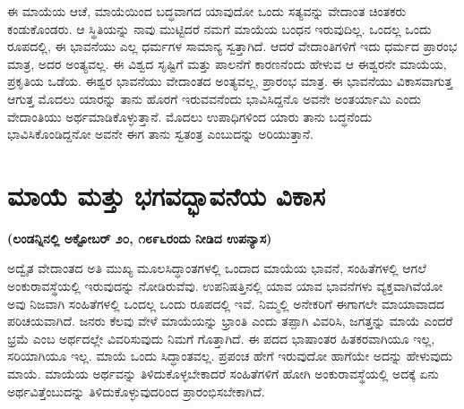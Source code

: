 \vskip 0.5cm

ಈ ಮಾಯೆಯ ಆಚೆ, ಮಾಯೆಯಿಂದ ಬದ್ಧವಾಗದ ಯಾವುದೋ ಒಂದು ಸತ್ಯವನ್ನು ವೇದಾಂತ ಚಿಂತಕರು ಕಂಡುಕೊಂಡರು. ಆ ಸ್ಥಿತಿಯನ್ನು ನಾವು ಮುಟ್ಟಿದರೆ ನಮಗೆ ಮಾಯೆಯ ಬಂಧನ ಇರುವುದಿಲ್ಲ. ಒಂದಲ್ಲ ಒಂದು ರೂಪದಲ್ಲಿ, ಈ ಭಾವನೆಯು ಎಲ್ಲ ಧರ್ಮಗಳ ಸಾಮಾನ್ಯ ಸ್ವತ್ತಾಗಿದೆ. ಆದರೆ ವೇದಾಂತಿಗಳಿಗೆ ಇದು ಧರ್ಮದ ಪ್ರಾರಂಭ ಮಾತ್ರ, ಅದರ ಅಂತ್ಯವಲ್ಲ. ಈ ವಿಶ್ವದ ಸೃಷ್ಟಿಗೆ ಮತ್ತು ಪಾಲನೆಗೆ ಕಾರಣನೆಂದು ಹೇಳುವ ಆ ಈಶ್ವರನೇ ಮಾಯೆಯ, ಪ್ರಕೃತಿಯ ಒಡೆಯ. ಈಶ್ವರ ಭಾವನೆಯು ವೇದಾಂತದ ಅಂತ್ಯವಲ್ಲ, ಪ್ರಾರಂಭ ಮಾತ್ರ. ಈ ಭಾವನೆಯು ವಿಕಾಸವಾಗುತ್ತ ಆಗುತ್ತ ಮೊದಲು ಯಾರನ್ನು ತಾನು ಹೊರಗೆ ಇರುವವನೆಂದು ಭಾವಿಸಿದ್ದನೊ ಅವನೇ ಅಂತರ್ಯಾಮಿ ಎಂದು ವೇದಾಂತಿಯು ಅರ್ಥಮಾಡಿಕೊಳ್ಳುತ್ತಾನೆ. ಮೊದಲು ಉಪಾಧಿಗಳಿಂದ ಯಾರು ತಾನು ಬದ್ಧನೆಂದು ಭಾವಿಸಿಕೊಂಡಿದ್ದನೋ ಅವನೇ ಈಗ ತಾನು ಸ್ವತಂತ್ರ ಎಂಬುದನ್ನು ಅರಿಯುತ್ತಾನೆ.

\chapter{ಮಾಯೆ ಮತ್ತು ಭಗವದ್ಭಾವನೆಯ ವಿಕಾಸ}%

\centerline{\textbf{(ಲಂಡನ್ನಿನಲ್ಲಿ ಅಕ್ಟೋಬರ್​ ೨೦, ೧೮೯೬ರಂದು ನೀಡಿದ ಉಪನ್ಯಾಸ)}}

\vskip 4pt

ಅದ್ವೈತ ವೇದಾಂತದ ಅತಿ ಮುಖ್ಯ ಮೂಲಸಿದ್ಧಾಂತಗಳಲ್ಲಿ ಒಂದಾದ ಮಾಯೆಯ ಭಾವನೆ, ಸಂಹಿತೆಗಳಲ್ಲಿ ಆಗಲೆ ಅಂಕುರಾವಸ್ಥೆಯಲ್ಲಿ ಇರುವುದನ್ನು ನೋಡಿರುವೆವು. ಉಪನಿಷತ್ತಿನಲ್ಲಿ ಯಾವ ಯಾವ ಭಾವನೆಗಳು ವ್ಯಕ್ತವಾಗಿವೆಯೋ ಅವು ನಿಜವಾಗಿ ಸಂಹಿತೆಗಳಲ್ಲಿ ಒಂದಲ್ಲ ಒಂದು ರೂಪದಲ್ಲಿ ಇವೆ. ನಿಮ್ಮಲ್ಲಿ ಅನೇಕರಿಗೆ ಈಗಾಗಲೇ ಮಾಯಾವಾದದ ಪರಿಚಯವಾಗಿದೆ. ಜನರು ಕೆಲವು ವೇಳೆ ಮಾಯೆಯನ್ನು ಭ್ರಾಂತಿ ಎಂದು ತಪ್ಪಾಗಿ ವಿವರಿಸಿ, ಜಗತ್ತನ್ನು ಮಾಯೆ ಎಂದರೆ ಭ್ರಮೆ ಎಂಬ ಅರ್ಥದಲ್ಲೇ ವಿವರಿಸುವುದು ನಿಮಗೆ ಗೊತ್ತಾಗಿದೆ. ಈ ಪದದ ಭಾಷಾಂತರ ಹಿತಕರವಾಗಿಯೂ ಇಲ್ಲ, ಸರಿಯಾಗಿಯೂ ಇಲ್ಲ. ಮಾಯೆ ಒಂದು ಸಿದ್ಧಾಂತವಲ್ಲ. ಪ್ರಪಂಚ ಹೇಗೆ ಇರುವುದೋ ಹಾಗೆಯೇ ಅದನ್ನು ಹೇಳುವುದು ಮಾಯೆ. ಮಾಯೆಯ ಅರ್ಥವನ್ನು ತಿಳಿದುಕೊಳ್ಳಬೇಕಾದರೆ ಸಂಹಿತೆಗಳಿಗೆ ಹೋಗಿ ಅಂಕುರಾವಸ್ಥೆಯಲ್ಲಿ ಅದಕ್ಕೆ ಏನು ಅರ್ಥವಿತ್ತೆಂಬುದನ್ನು ತಿಳಿದುಕೊಳ್ಳುವುದರಿಂದ ಪ್ರಾರಂಭಿಸಬೇಕಾಗಿದೆ.

\vskip 0.2cm

